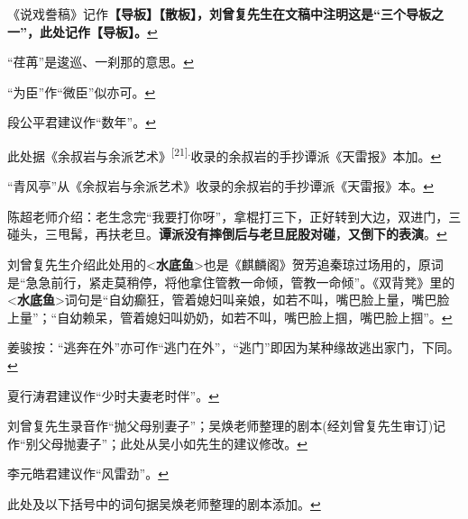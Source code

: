   \leavevmode\hypertarget{fn478}{}%
  《说戏誊稿》记作\textbf{【导板】【散板】，刘曾复先生在文稿中注明这是``三个导板之一''，此处记作【导板】。}\protect\hyperlink{fnref478}{↩}
\item
  \leavevmode\hypertarget{fn479}{}%
  ``荏苒''是逡巡、一刹那的意思。\protect\hyperlink{fnref479}{↩}
\item
  \leavevmode\hypertarget{fn480}{}%
  ``为臣''作``微臣''似亦可。\protect\hyperlink{fnref480}{↩}
\item
  \leavevmode\hypertarget{fn481}{}%
  段公平君建议作``数年''。\protect\hyperlink{fnref481}{↩}
\item
  \leavevmode\hypertarget{fn482}{}%
  此处据《余叔岩与余派艺术》\textsuperscript{{[}21{]}.}收录的余叔岩的手抄谭派《天雷报》本加。\protect\hyperlink{fnref482}{↩}
\item
  \leavevmode\hypertarget{fn483}{}%
  ``青风亭''从《余叔岩与余派艺术》收录的余叔岩的手抄谭派《天雷报》本。\protect\hyperlink{fnref483}{↩}
\item
  \leavevmode\hypertarget{fn484}{}%
  陈超老师介绍：老生念完``我要打你呀''，拿棍打三下，正好转到大边，双进门，三碰头，三甩髯，再扶老旦。\textbf{谭派没有摔倒后与老旦屁股对碰}，\textbf{又倒下的表演}。\protect\hyperlink{fnref484}{↩}
\item
  \leavevmode\hypertarget{fn485}{}%
  刘曾复先生介绍此处用的\textless{}\textbf{水底鱼}\textgreater{}也是《麒麟阁》贺芳追秦琼过场用的，原词是``急急前行，紧走莫稍停，将他拿住管教一命倾，管教一命倾''。《双背凳》里的\textless{}\textbf{水底鱼}\textgreater{}词句是``自幼癫狂，管着媳妇叫亲娘，如若不叫，嘴巴脸上量，嘴巴脸上量''；``自幼赖呆，管着媳妇叫奶奶，如若不叫，嘴巴脸上掴，嘴巴脸上掴''。\protect\hyperlink{fnref485}{↩}
\item
  \leavevmode\hypertarget{fn486}{}%
  姜骏按：``逃奔在外''亦可作``逃门在外''，``逃门''即因为某种缘故逃出家门，下同。\protect\hyperlink{fnref486}{↩}
\item
  \leavevmode\hypertarget{fn487}{}%
  夏行涛君建议作``少时夫妻老时伴''。\protect\hyperlink{fnref487}{↩}
\item
  \leavevmode\hypertarget{fn488}{}%
  刘曾复先生录音作``抛父母别妻子''；吴焕老师整理的剧本(经刘曾复先生审订)记作``别父母抛妻子''；此处从吴小如先生的建议修改。\protect\hyperlink{fnref488}{↩}
\item
  \leavevmode\hypertarget{fn489}{}%
  李元皓君建议作``风雷劲''。\protect\hyperlink{fnref489}{↩}
\item
  \leavevmode\hypertarget{fn490}{}%
  此处及以下括号中的词句据吴焕老师整理的剧本添加。\protect\hyperlink{fnref490}{↩}
